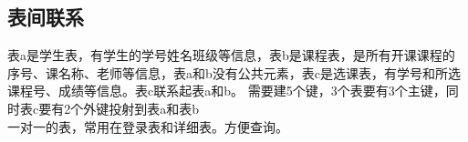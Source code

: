 \documentclass[UTF8]{../computerUniverse}
\begin{document}
    \begin{comment}
        CREATE TABLE IF NOT EXISTS table_name(
            字段名称 字段类型 [可选：完整性约束条件]
    
        ) EIGEN=存储引擎, charset=编码方式
    
        数值类型：
            整形
            TINYINT (-128, 127) or (0, 255)，即8次幂，1字节
            SMALLINT 16次幂，2字节
            MEDIUMINT 24次幂，3字节
            INT (-2^31, 2^31-1) or (0, 2^24-1)，32次幂，4字节
            BIGINT 64次幂，8字节
            BOOL, BOOLEAN, 等价于TINYINT(1)，1字节
    
            浮点型
            FLOAT[(M,D)],M是总位数，D是小数位数，单精度浮点数精度大约7位小数。不设置时根据硬件条件设置
            取值范围(-3.4e38, -1.17e-38) & 0 & (1.175e-38, 3.4e38), 4字节
            DOUBLE[(M,D)],M是总位数，D是小数位数，取值范围(-1.79e308, -2.22e-308) & 0 & (2.22e-308, 1.79e308), 8字节
            DECIMAL[(M,D)],M是总位数，D是小数位数，类似DOUBLE，内部以字符串形式存储，字节M+2
    
            字符串类型
            CHAR(M), 定长串, M字节, M=[0,255]
            VAARCHAR(M), 变长串, 所占字节为L+1   小于M，M=[0,2^16-1],65536-1
            TINYTEXT, L < 2^8，L+1字节
            TEXT, L < 2^16，L+2字节
            MEDIUMTEXT, L < 2^24，L+3字节
            LONGTEXT, L < 2^32，L+4字节
            ENUM('VALUE1', 'VALUE2',...), 枚举，1或2字节，取决于枚举个数，最多2^16-1个值
            SET('VALUE1', 'VALUE2',...), 集合，1或2或3或4或8字节，取决于set成员个数，最多64个值
    
            日期类型:
            DATE, 3字节
            TIME, 3字节
            YEAR, 1字节
            DATETIME, 8字节
            TIMESTAMP 4字节
    
            二进制类型：
            不常用。
        
    
    \end{comment}
    
    
    
    
    \subsection{表间联系}
    表a是学生表，有学生的学号姓名班级等信息，表b是课程表，是所有开课课程的序号、课名称、老师等信息，表a和b没有公共元素，表c是选课表，有学号和所选课程号、成绩等信息。表c联系起表a和b。
    需要建5个键，3个表要有3个主键，同时表c要有2个外键投射到表a和表b\\
    一对一的表，常用在登录表和详细表。方便查询。
    
\end{document}
